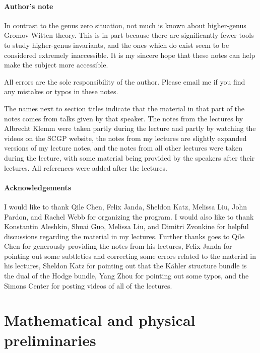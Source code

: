 \documentclass[10pt]{amsart}
\theoremstyle{definition}
\theoremstyle{remark}
\theoremstyle{plain}
\theoremstyle{definition}
\theoremstyle{remark}
\newcommand{\1}{\mathbf{1}}
\newcommand{\2}{\mathbf{2}}
\newcommand{\3}{\mathbf{3}}
\begin{document}
\subsection*{Author's note}%
\label{sub:Disclaimer}

In contrast to the genus zero situation, not much is known about higher-genus Gromov-Witten theory. This is in part because there are significantly fewer tools to study higher-genus invariants, and the ones which do exist seem to be considered extremely inaccessible. It is my sincere hope that these notes can help make the subject more accessible. 

All errors are the sole responsibility of the author. Please email me if you find any mistakes or typos in these notes.

The names next to section titles indicate that the material in that part of the notes comes from talks given by that speaker. The notes from the lectures by Albrecht Klemm were taken partly during the lecture and partly by watching the videos on the SCGP website, the notes from my lectures are slightly expanded versions of my lecture notes, and the notes from all other lectures were taken during the lecture, with some material being provided by the speakers after their lectures. All references were added after the lectures.

\subsection*{Acknowledgements}%
\label{sub:Acknowledgements}

I would like to thank Qile Chen, Felix Janda, Sheldon Katz, Melissa Liu, John Pardon, and Rachel Webb for organizing the program. I would also like to thank Konstantin Aleshkin, Shuai Guo, Melissa Liu, and Dimitri Zvonkine for helpful discussions regarding the material in my lectures. Further thanks goes to Qile Chen for generously providing the notes from his lectures, Felix Janda for pointing out some subtleties and correcting some errors related to the material in his lectures, Sheldon Katz for pointing out that the K\"ahler structure bundle is the dual of the Hodge bundle, Yang Zhou for pointing out some typos, and the Simons Center for posting videos of all of the lectures.


\part{Mathematical and physical preliminaries}
\label{pt:prelim}
\end{document}
